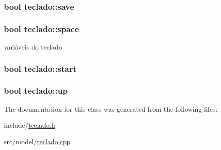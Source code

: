 \subsubsection[{\texorpdfstring{save}{save}}]{\setlength{\rightskip}{0pt plus 5cm}bool teclado\+::save\hspace{0.3cm}{\ttfamily [private]}}\hypertarget{classteclado_a4f469df852c3dd6ff88e0ec6babe1965}{}\label{classteclado_a4f469df852c3dd6ff88e0ec6babe1965}
\subsubsection[{\texorpdfstring{space}{space}}]{\setlength{\rightskip}{0pt plus 5cm}bool teclado\+::space\hspace{0.3cm}{\ttfamily [private]}}\hypertarget{classteclado_a4b4ccb376875a14e2b3962a407994c8b}{}\label{classteclado_a4b4ccb376875a14e2b3962a407994c8b}
variáveis do teclado 
\subsubsection[{\texorpdfstring{start}{start}}]{\setlength{\rightskip}{0pt plus 5cm}bool teclado\+::start\hspace{0.3cm}{\ttfamily [private]}}\hypertarget{classteclado_a6c14e3a2dbae6bda094ae925e341edf0}{}\label{classteclado_a6c14e3a2dbae6bda094ae925e341edf0}
\subsubsection[{\texorpdfstring{up}{up}}]{\setlength{\rightskip}{0pt plus 5cm}bool teclado\+::up\hspace{0.3cm}{\ttfamily [private]}}\hypertarget{classteclado_a74a37a3c06db1e530c2da93c16c2d820}{}\label{classteclado_a74a37a3c06db1e530c2da93c16c2d820}


The documentation for this class was generated from the following files\+:\begin{DoxyCompactItemize}
\item 
include/\hyperlink{teclado_8h}{teclado.\+h}\item 
src/model/\hyperlink{teclado_8cpp}{teclado.\+cpp}\end{DoxyCompactItemize}
